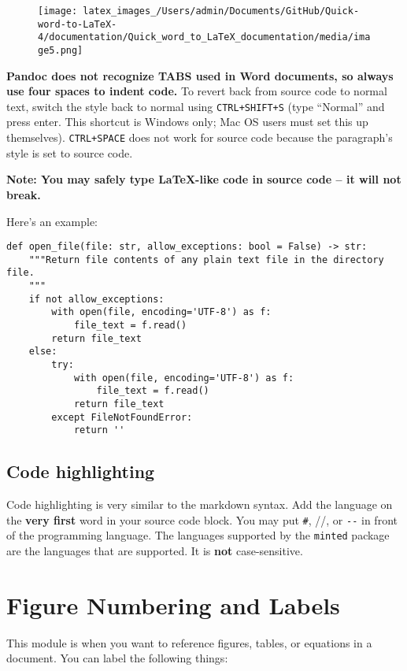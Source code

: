 \documentclass[12pt]{article}
\theoremstyle{plain}
\theoremstyle{remark}
\theoremstyle{definition}
\begin{document}
\begin{figure}[H]
\centering
\texttt{[image: latex\_images\_/Users/admin/Documents/GitHub/Quick-word-to-LaTeX-4/documentation/Quick\_word\_to\_LaTeX\_documentation/media/image5.png]}
\end{figure}


\textbf{Pandoc does not recognize TABS used in Word documents, so always
use four spaces to indent code.} To revert back from source code to
normal text, switch the style back to normal using \texttt{CTRL+SHIFT+S}
(type ``Normal'' and press enter. This shortcut is Windows only; Mac OS
users must set this up themselves). \texttt{CTRL+SPACE} does not work
for source code because the paragraph's style is set to source code.

\textbf{Note: You may safely type LaTeX-like code in source code -- it
will not break.}

Here's an example:

\begin{verbatim}
def open_file(file: str, allow_exceptions: bool = False) -> str:
    """Return file contents of any plain text file in the directory file.
    """
    if not allow_exceptions:
        with open(file, encoding='UTF-8') as f:
            file_text = f.read()
        return file_text
    else:
        try:
            with open(file, encoding='UTF-8') as f:
                file_text = f.read()
            return file_text
        except FileNotFoundError:
            return ''
\end{verbatim}


\subsection{Code highlighting}

Code highlighting is very similar to the markdown syntax. Add the
language on the \textbf{very first} word in your source code block. You
may put \texttt{\#}, //, or \texttt{-\/-} in front of the programming
language. The languages supported by the \texttt{minted} package are the
languages that are supported. It is \textbf{not} case-sensitive.


\section{Figure Numbering and
Labels}

This module is when you want to reference figures, tables, or equations
in a document. You can label the following things:
\end{document}
